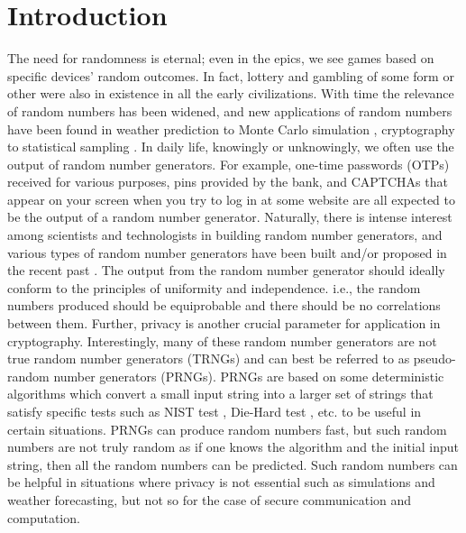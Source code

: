 \documentclass[]{interact}
\theoremstyle{plain}%
\theoremstyle{definition}
\theoremstyle{remark}
\begin{document}
\section{Introduction}

The need for randomness is eternal; even in the epics, we see games based on specific devices' random outcomes. In fact, lottery and gambling of some form or other were also in existence in all the early civilizations. With time the relevance of random numbers has been widened, and new applications of random numbers have been found in weather prediction to Monte Carlo simulation \cite{Metropolis1949,Karp1991,10.1145/234313.234327}, cryptography to statistical sampling \cite{6769090,1621063}. In daily life, knowingly or unknowingly, we often use the output of random number generators. For example, one-time passwords (OTPs) received for various purposes, pins provided by the bank, and CAPTCHAs that appear on your screen when you try to log in at some website are all expected to be the output of a random number generator. Naturally, there is intense interest among scientists and technologists in building random number generators, and various types of random number generators have been built and/or proposed in the recent past \cite{james1990review,herrero2017quantum,ma2016quantum,jacak2021quantum}. The output from the random number generator should ideally conform to the principles of uniformity and independence. i.e., the random numbers produced should be equiprobable and there should be no correlations between them.
Further, privacy is another crucial parameter for application in cryptography. Interestingly, many of these random number generators are not true random number generators (TRNGs) and can best be referred to as pseudo-random number generators (PRNGs). PRNGs \cite{james1990review,hormann2004automatic,hull1962random} are based on some deterministic algorithms which convert a small input string into a larger set of strings that satisfy specific tests such as NIST test \cite{rukhin2001statistical}, Die-Hard test \cite{marsaglia2008marsaglia}, etc. to be useful in certain situations. PRNGs can produce random numbers fast, but such random numbers are not truly random as if one knows the algorithm and the initial input string, then all the random numbers can be predicted. Such random numbers can be helpful in situations where privacy is not essential such as simulations and weather forecasting, but not so for the case of secure communication and computation. 
\end{document}
